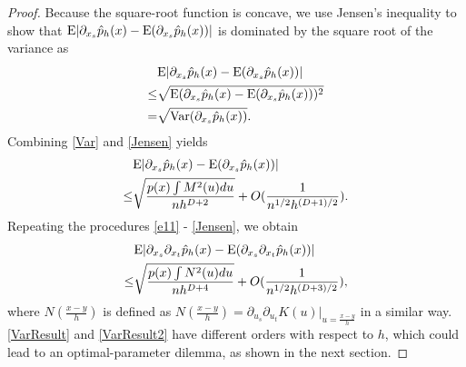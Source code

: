 \documentclass[aos,preprint]{imsart}
\theoremstyle{remark}
\begin{document}
\begin{appendix}
\begin{proof}
Because the square-root function is concave, we use Jensen's inequality to show that ${\rm E} |\partial_{x_s} \hat{p}_h(x)-{\rm E}(\partial_{x_s} \hat{p}_h(x))|$ is dominated by the square root of the variance as
\begin{equation}\label{Jensen}
\begin{aligned}
 & {\rm E}|\partial_{x_s} \hat{p}_h(x)-{\rm E}(\partial_{x_s} \hat{p}_h(x))|\\
\leq &\sqrt{{\rm E}(\partial_{x_s} \hat{p}_h(x)-{\rm E}(\partial_{x_s} \hat{p}_h(x)))^2}\\
 = & \sqrt{{\rm Var}(\partial_{x_s}\hat{p}_h(x))} .
\end{aligned}
\end{equation}
Combining \eqref{Var} and \eqref{Jensen} yields
\begin{equation}\label{VarResult}
\begin{aligned}
&{\rm E} |\partial_{x_s} \hat{p}_h(x)-{\rm E}(\partial_{x_s} \hat{p}_h(x))| \\
\leq &\sqrt{\frac{p(x)\int M^2(u)du}{n h^{D+2}}}+O(\frac{1}{n^{1/2}h^{(D+1)/2}}).
\end{aligned}
\end{equation}
Repeating the procedures \eqref{e11} - \eqref{Jensen},  we obtain
\begin{equation}\label{VarResult2}
\begin{aligned}
&{\rm E} | \partial_{x_s}\partial_{x_t} \hat{p}_h(x) -{\rm E}(\partial_{x_s}\partial_{x_t} \hat{p}_h(x))| \\
\leq & \sqrt{\frac{p(x)\int N^2(u)du}{nh^{D+4}}}+O(\frac{1}{n^{1/2}h^{(D+3)/2}}),
\end{aligned}
\end{equation}
where $N(\frac{x-y}{h}) $ is defined as $N(\frac{x-y}{h}) = \partial_ {u_s}\partial_{u_t}  K(u)|_{u=\frac{x-y}{h}}$ in a similar way.
\eqref{VarResult} and \eqref{VarResult2} have different orders with respect to $h$, which could lead to an optimal-parameter dilemma, as shown in the next section.
\end{proof}

\end{appendix}
\end{document}
